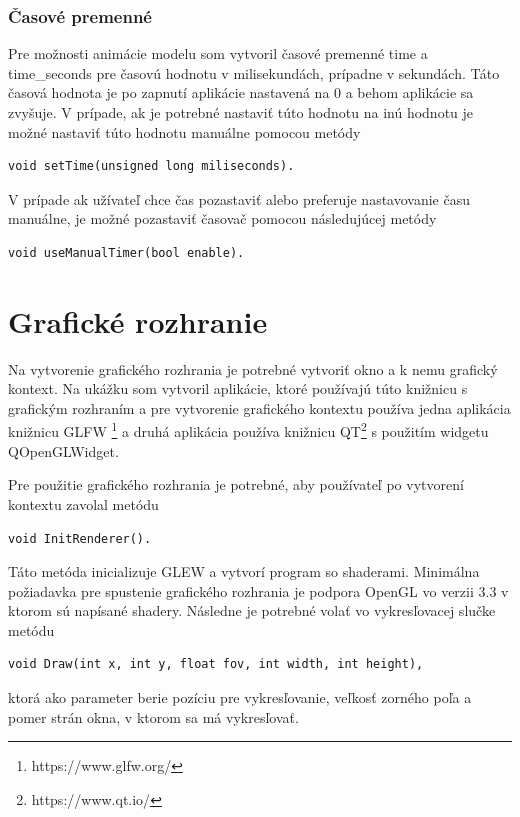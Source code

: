 \subsubsection*{Časové premenné}
Pre možnosti animácie modelu som vytvoril časové premenné time a time\_seconds pre časovú hodnotu v milisekundách, prípadne v sekundách. Táto časová hodnota je po zapnutí aplikácie nastavená na 0 a behom aplikácie sa zvyšuje. V prípade, ak je potrebné nastaviť túto hodnotu na inú hodnotu je možné nastaviť túto hodnotu manuálne pomocou metódy
\begin{lstlisting}
void setTime(unsigned long miliseconds).
\end{lstlisting}
V prípade ak užívateľ chce čas pozastaviť alebo preferuje nastavovanie času manuálne, je možné pozastaviť časovač pomocou následujúcej metódy
\begin{lstlisting}
void useManualTimer(bool enable).
\end{lstlisting}

\section{Grafické rozhranie}
Na vytvorenie grafického rozhrania je potrebné vytvoriť okno a k nemu grafický kontext. Na ukážku som vytvoril aplikácie, ktoré používajú túto knižnicu s grafickým rozhraním a pre vytvorenie grafického kontextu používa jedna aplikácia knižnicu GLFW \footnote{https://www.glfw.org/} a druhá aplikácia používa knižnicu QT\footnote{https://www.qt.io/} s použitím widgetu QOpenGLWidget. 

Pre použitie grafického rozhrania je potrebné, aby používateľ po vytvorení kontextu zavolal metódu 
\begin{lstlisting}
void InitRenderer().
\end{lstlisting}
Táto metóda inicializuje GLEW a vytvorí program so shaderami.  Minimálna požiadavka pre spustenie grafického rozhrania je podpora OpenGL vo verzii 3.3 v ktorom sú napísané shadery.
Následne je potrebné volať vo vykresľovacej slučke metódu  
\begin{lstlisting}
void Draw(int x, int y, float fov, int width, int height),
\end{lstlisting}
ktorá ako parameter berie pozíciu pre vykresľovanie, veľkosť zorného poľa a pomer strán okna, v ktorom sa má vykresľovať.

